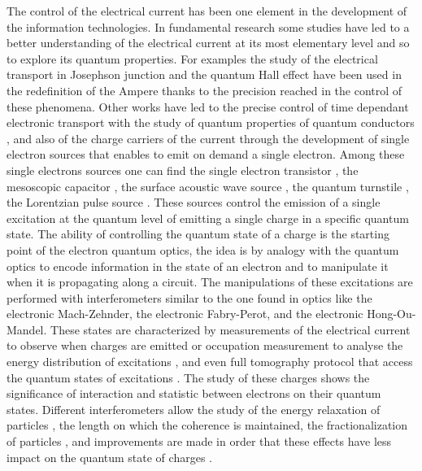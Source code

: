 The control of the electrical current has been one element in the development of the information technologies.
In fundamental research some studies have led to a better understanding of the electrical current at its most elementary level and so to explore its quantum properties.
For examples the study of the electrical transport in Josephson junction and the quantum Hall effect \cite{von1986quantized} have been used in the redefinition of the Ampere \cite{stock2019revision,taylor1989new} thanks to the precision reached in the control of these phenomena.
Other works have led to the precise control of time dependant electronic transport with the study of quantum properties of quantum conductors \cite{gabelli2006violation}, and also of the charge carriers of the current through the development of single electron sources that enables to emit on demand a single electron.
Among these single electrons sources one can find the single electron transistor \cite{pothier1992single}, the mesoscopic capacitor \cite{feve2007on-demand}, the surface acoustic wave source \cite{hermelin2011electrons}, the quantum turnstile \cite{giblin2012towards}, the Lorentzian pulse source \cite{dubois2013minimal}.
These sources control the emission of a single excitation at the quantum level of emitting a single charge in a specific quantum state.
The ability of controlling the quantum state of a charge is the starting point of the electron quantum optics, the idea is by analogy with the quantum optics to encode information in the state of an electron and to manipulate it when it is propagating along a circuit.
The manipulations of these excitations are performed with interferometers similar to the one found in optics like the electronic Mach-Zehnder, the electronic Fabry-Perot, and the electronic Hong-Ou-Mandel.
These states are characterized by measurements of the electrical current to observe when charges are emitted \cite{hashisaka2017waveform,roussely2018unveiling} or occupation measurement to analyse the energy distribution of excitations \cite{le2010energy,rodriguez2020relaxation}, and even full tomography protocol that access the quantum states of excitations \cite{jullien2014quantum,fletcher2019quantum,bisognin2019quantum}.
The study of these charges shows the significance of interaction and statistic between electrons on their quantum states.
Different interferometers allow the study of the energy relaxation of particles \cite{marguerite2016decoherence}, the length on which the coherence is maintained, the fractionalization of particles \cite{freulon2015hong}, and improvements are made in order that these effects have less impact on the quantum state of charges \cite{huynh2012quantum,cabart2018taming,duprez2019macroscopic}.
